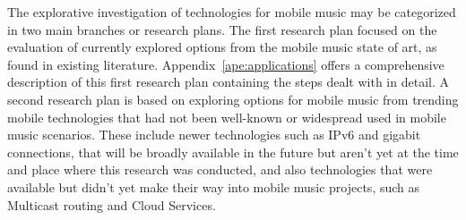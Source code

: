 The explorative investigation of technologies for mobile music may be categorized in two main branches or research plans.
The first research plan focused on the evaluation of currently explored options from the mobile music state of art, as found in existing literature.
Appendix~\ref{ape:applications} offers a comprehensive description of this first research plan containing the steps dealt with in detail.
A second research plan is based on exploring options for mobile music from trending mobile technologies that had not been well-known or widespread used in mobile music scenarios. 
These include newer technologies such as IPv6 and gigabit connections, that will be broadly available in the future but aren't yet at the time and place where this research was conducted, and also technologies that were available but didn't yet make their way into mobile music projects, such as Multicast routing and Cloud Services.






